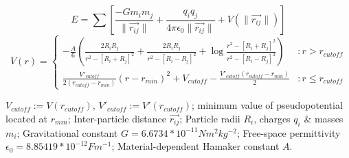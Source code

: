 \documentclass[letterpaper, preprint, paper,11pt]{AAS}
\begin{document}
\begin{equation}
E = \sum\left[\frac{-Gm_im_j}{\|\vec{r_{ij}}\|}+\frac{q_iq_j}{4\pi\epsilon_0\|\vec{r_{ij}}\|}+V(\|\vec{r_{ij}}\|)\right]
\end{equation}
\begin{equation}
V(r) = \left\{
\begin{array}{lr}
-\frac{A}{6}\left(\frac{2R_iR_j}{r^2-[R_i+R_j]^2}+\frac{2R_iR_j}{r^2-[R_i-R_j]^2}+\log\frac{r^2-[R_i+R_j]^2}{r^2-[R_i-R_j]^2}\right) & : r > r_{cutoff}\\
\frac{V'_{cutoff}}{2(r_{cutoff}-r_{min})}(r-r_{min})^2+V_{cutoff} - \frac{V'_{cutoff}(r_{cutoff}-r_{min})}{2} & : r \leq r_{cutoff}
\end{array}
\right.
\end{equation}

$V_{cutoff} := V(r_{cutoff})$,  $V'_{cutoff} := V'(r_{cutoff})$; minimum value of pseudopotential located at $r_{min}$; Inter-particle distance $\vec{r_{ij}}$; Particle radii $R_i$, charges $q_i$ \& masses $m_i$; Gravitational constant $G = 6.6734*10^{-11} Nm^2kg^{-2} $; Free-space permittivity $\epsilon_0 = 8.85419*10^{-12} Fm^{-1}$; Material-dependent Hamaker constant $A$. 
\end{document}
